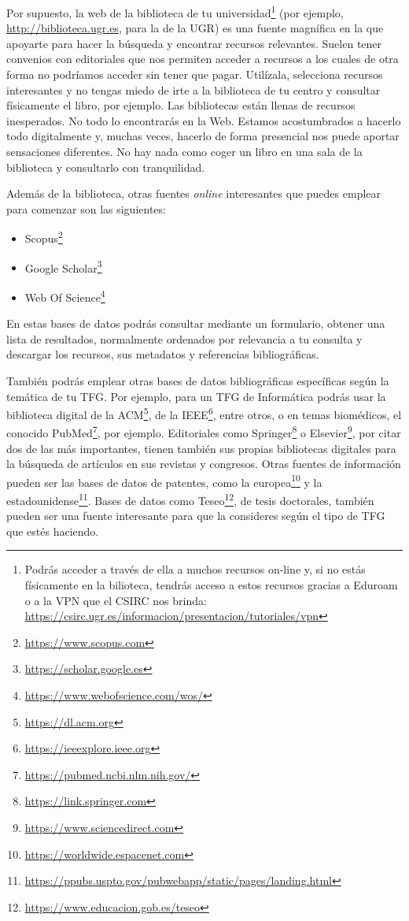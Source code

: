 Por supuesto, la web de la biblioteca de tu universidad\footnote{Podrás acceder a través de ella a muchos recursos on-line y, si no estás físicamente en la bilioteca, tendrás acceso a estos recursos gracias a Eduroam o a la VPN que el CSIRC nos brinda: \url{https://csirc.ugr.es/informacion/presentacion/tutoriales/vpn}} (por ejemplo, \url{http://biblioteca.ugr.es}, para la de la UGR) es una fuente magnífica en la que apoyarte para hacer la búsqueda y encontrar recursos relevantes. Suelen tener convenios con editoriales que nos permiten acceder a recursos a los cuales de otra forma no podríamos acceder sin tener que pagar. Utilízala, selecciona recursos interesantes y no tengas miedo de irte a la biblioteca de tu centro y consultar físicamente el libro, por ejemplo. Las bibliotecas están llenas de recursos inesperados. No todo lo encontrarás en la Web. Estamos acostumbrados a hacerlo todo digitalmente y, muchas veces, hacerlo de forma presencial nos puede aportar sensaciones diferentes. No hay nada como coger un libro en una sala de la biblioteca y consultarlo con tranquilidad. 

Además de la biblioteca, otras fuentes \textit{online} interesantes que puedes emplear para comenzar son las siguientes:

\begin{itemize}
    \item {Scopus}\footnote{\url{https://www.scopus.com}}
    \item {Google Scholar}\footnote{\url{https://scholar.google.es}}
    \item Web Of Science\footnote{\url{https://www.webofscience.com/wos/}}
\end{itemize}

En estas bases de datos podrás consultar mediante un formulario, obtener una lista de resultados, normalmente ordenados por relevancia a tu consulta y descargar los recursos, sus metadatos y referencias bibliográficas.

También podrás emplear otras bases de datos bibliográficas específicas según la temática de tu TFG. Por ejemplo, para un TFG de Informática podrás usar la {biblioteca digital de la ACM}\footnote{\url{https://dl.acm.org}}, de la {IEEE}\footnote{\url{https://ieeexplore.ieee.org}}, entre otros, o en temas biomédicos, el conocido {PubMed}\footnote{\url{https://pubmed.ncbi.nlm.nih.gov/}}, por ejemplo. Editoriales como {Springer}\footnote{\url{https://link.springer.com}} o {Elsevier}\footnote{\url{https://www.sciencedirect.com}}, por citar dos de las más importantes, tienen también sus propias bibliotecas digitales para la búsqueda de artículos en sus revistas y congresos. Otras fuentes de información pueden ser las bases de datos de patentes, como la {europea}\footnote{\url{https://worldwide.espacenet.com}} y la {estadounidense}\footnote{\url{https://ppubs.uspto.gov/pubwebapp/static/pages/landing.html}}. Bases de datos como {Teseo}\footnote{\url{https://www.educacion.gob.es/teseo}}, de tesis doctorales, también pueden ser una fuente interesante para que la consideres según el tipo de TFG que estés haciendo.

